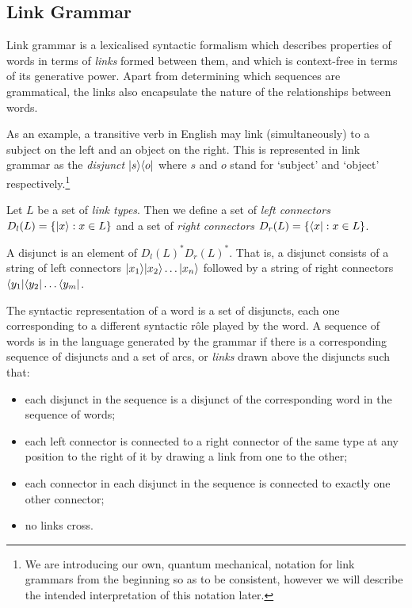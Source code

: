 \documentclass[12pt]{report}
\begin{document}

\subsection{Link Grammar}



Link grammar \citep{Sleator:91} is a lexicalised syntactic formalism which describes properties of words in terms of \emph{links} formed between them, and which is context-free in terms of its generative power. Apart from determining which sequences are grammatical, the links also encapsulate the nature of the relationships between words.

As an example, a transitive verb in English may link (simultaneously) to a subject on the left and an object on the right. This is represented in link grammar as the \emph{disjunct} $|s \rangle\langle o|$ where $s$ and $o$ stand for `subject' and `object' respectively.\footnote{We are introducing our own, quantum mechanical, notation for link grammars from the beginning so as to be consistent, however we will describe the intended interpretation of this notation later.}

\begin{defn}
Let $L$ be a set of \emph{link types}. Then we define a set of \emph{left connectors} $D_l(L) = \{|x \rangle : x \in L\}$ and a set of \emph{right connectors} $D_r(L) = \{\langle x| : x \in L\}$.

A disjunct is an element of $D_l(L)^*D_r(L)^*$. That is, a disjunct consists of a string of left connectors $|x_1 \rangle|x_2 \rangle\ldots|x_n \rangle$ followed by a string of right connectors $\langle y_1|\langle y_2|\ldots\langle y_m|$.

The syntactic representation of a word is a set of disjuncts, each one corresponding to a different syntactic r\^ole played by the word. A sequence of words is in the language generated by the grammar if there is a corresponding sequence of disjuncts and a set of arcs, or \emph{links} drawn above the disjuncts such that:
\begin{itemize}
\item each disjunct in the sequence is a disjunct of the corresponding word in the sequence of words;
\item each left connector is connected to a right connector of the same type at any position to the right of it by drawing a link from one to the other;
\item each connector in each disjunct in the sequence is connected to exactly one other connector;
\item no links cross.
\end{itemize}
\end{defn}
\end{document}
